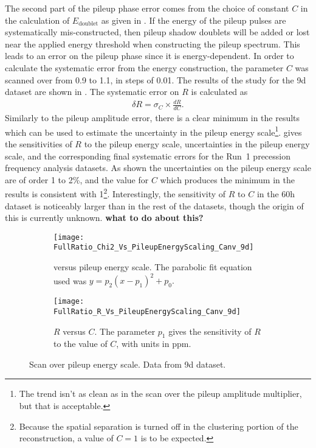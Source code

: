 The second part of the pileup phase error comes from the choice of constant $C$ in the calculation of $E_{\text{doublet}}$ as given in . If the energy of the pileup pulses are systematically mis-constructed, then pileup shadow doublets will be added or lost near the applied energy threshold when constructing the pileup spectrum. This leads to an error on the pileup phase since it is energy-dependent. In order to calculate the systematic error from the energy construction, the parameter $C$ was scanned over from 0.9 to 1.1, in steps of 0.01. The results of the study for the 9d dataset are shown in . The systematic error on $R$ is calculated as 
    \begin{align}
        \delta R = \sigma_{C} \times \frac{dR}{dC}.
    \end{align}
Similarly to the pileup amplitude error, there is a clear minimum in the \chisq results which can be used to estimate the uncertainty in the pileup energy scale\footnote{The trend isn't as clean as in the scan over the pileup amplitude multiplier, but that is acceptable.}.  gives the sensitivities of $R$ to the pileup energy scale, uncertainties in the pileup energy scale, and the corresponding final systematic errors for the Run~1 precession frequency analysis datasets. As shown the uncertainties on the pileup energy scale are of order 1 to 2\%, and the value for $C$ which produces the minimum in the \chisq results is consistent with 1\footnote{Because the spatial separation is turned off in the clustering portion of the reconstruction, a value of $C = 1$ is to be expected.}. Interestingly, the sensitivity of $R$ to $C$ in the 60h dataset is noticeably larger than in the rest of the datasets, though the origin of this is currently unknown. \textbf{what to do about this?}


\begin{figure}[]
\centering
    \begin{subfigure}[t]{0.45\textwidth}
        \centering
        \texttt{[image: FullRatio\_Chi2\_Vs\_PileupEnergyScaling\_Canv\_9d]}
        \caption{\chisq versus pileup energy scale. The parabolic fit equation used was $y = p_{2}(x - p_{1})^{2} + p_{0}.$}
    \end{subfigure}%
    \hspace{1cm}
    \begin{subfigure}[t]{0.45\textwidth}
        \centering
        \texttt{[image: FullRatio\_R\_Vs\_PileupEnergyScaling\_Canv\_9d]}
        \caption{$R$ versus $C$. The parameter $p_{1}$ gives the sensitivity of $R$ to the value of $C$, with units in ppm.}
    \end{subfigure}
\caption[Pileup energy scale scan]{Scan over pileup energy scale. Data from 9d dataset.}
\label{fig:PEscan}
\end{figure}


